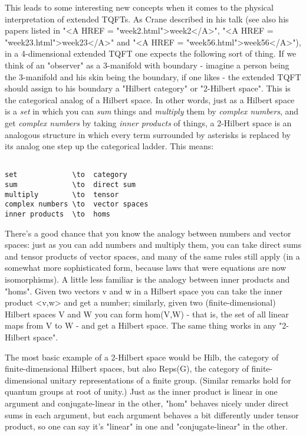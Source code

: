 This leads to some interesting new concepts when it comes to the physical
interpretation of extended TQFTs.   As Crane described in his talk
(see also his papers listed in "<A HREF = "week2.html">week2</A>", "<A HREF = "week23.html">week23</A>" and "<A HREF = "week56.html">week56</A>"), in a 
4-dimensional extended TQFT one expects the following sort of thing.  
If we think of an "observer" as a 3-manifold with boundary - 
imagine a person being the 3-manifold and his skin being the 
boundary, if one likes - the extended TQFT should assign to his boundary a 
"Hilbert category" or "2-Hilbert space".   This is the categorical analog of a
Hilbert space.  In other words, just as a Hilbert space is a \emph{set} 
in which 
you can \emph{sum} things and \emph{multiply} them 
by \emph{complex numbers}, and 
get \emph{complex numbers} by taking \emph{inner products} of things, a 
2-Hilbert space is an analogous structure in which every term 
surrounded by asterisks is replaced by its analog
one step up the categorical ladder.  This means:


\begin{verbatim}

set             \to  category
sum             \to  direct sum
multiply        \to  tensor
complex numbers \to  vector spaces
inner products  \to  homs
\end{verbatim}
    

There's a good chance that you know the analogy between numbers and vector
spaces: just as you can add numbers and multiply them, you can take direct sums
and tensor products of vector spaces, and many of the same rules still 
apply (in a somewhat more sophisticated form, because laws that were 
equations are now isomorphisms).  A little less familiar is the 
analogy between inner products and "homs".  Given two vectors v and w in a 
Hilbert space you can take the inner product <v,w> and get a number; 
similarly, given two (finite-dimensional) Hilbert 
spaces V and W you can form hom(V,W) - that is, the set of all linear 
maps from V to W - and get a Hilbert space.  The same thing works in any 
"2-Hilbert space".  

The most basic example of a 2-Hilbert space would be Hilb, the category of 
finite-dimensional Hilbert spaces, but also Reps(G), the category of finite-
dimensional unitary representations of a finite group.  (Similar remarks hold 
for quantum groups at root of unity.)  Just as the inner product is linear 
in one argument and conjugate-linear in the other, "hom" behaves nicely 
under direct sums in each argument, but each argument behaves a bit 
differently under tensor product, so one can say it's "linear" in 
one and "conjugate-linear" in the other.  
      
